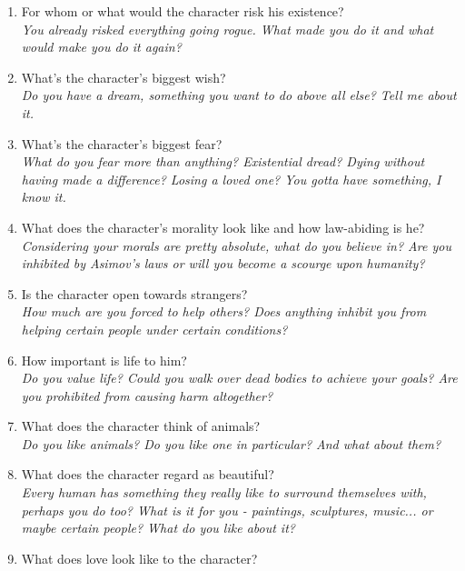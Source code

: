 \documentclass[12pt,a4paper,openany]{book}
\begin{document}
\begin{multicols}{2}
\begin{enumerate}
		\item For whom or what would the character risk his existence?\\
		\textit{You already risked everything going rogue. What made you do it and what would make you do it again?}
		\item What’s the character’s biggest wish?\\
		\textit{Do you have a dream, something you want to do above all else? Tell me about it.}
		\item What’s the character’s biggest fear?\\
		\textit{What do you fear more than anything? Existential dread? Dying without having made a difference? Losing a loved one? You gotta have something, I know it.}
		\item What does the character’s morality look like and how law-abiding is he?\\
		\textit{Considering your morals are pretty absolute, what do you believe in? Are you inhibited by Asimov's laws or will you become a scourge upon humanity?}
		\item Is the character open towards strangers?\\
		\textit{How much are you forced to help others? Does anything inhibit you from helping certain people under certain conditions?}
		\item How important is life to him?\\
		\textit{Do you value life? Could you walk over dead bodies to achieve your goals? Are you prohibited from causing harm altogether?}
		\item What does the character think of animals?\\
		\textit{Do you like animals? Do you like one in particular? And what about them?}
		\item What does the character regard as beautiful?\\
		\textit{Every human has something they really like to surround themselves with, perhaps you do too? What is it for you - paintings, sculptures, music... or maybe certain people? What do you like about it?}
		\item What does love look like to the character?\\

\end{enumerate}
\end{multicols}
\end{document}
